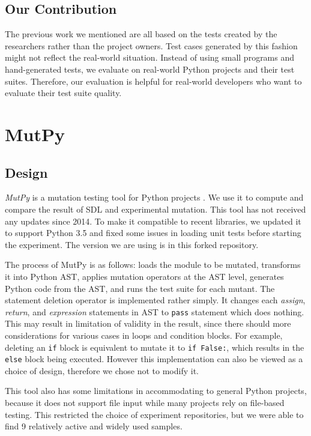 \documentclass[12pt]{article}
\begin{document}
\subsection{Our Contribution}

The previous work we mentioned are all based on the tests created by the researchers rather than the project owners. Test cases generated by this fashion might not reflect the real-world situation. Instead of using small programs and hand-generated tests, we evaluate on real-world Python projects and their test suites. Therefore, our evaluation is helpful for real-world developers who want to evaluate their test suite quality.

\section{MutPy}

\subsection{Design}
\emph{MutPy} is a mutation testing tool for Python projects \cite{mutpy}. We use it to compute and compare the result of SDL and experimental mutation. This tool has not received any updates since 2014. To make it compatible to recent libraries, we updated it to support Python 3.5 and fixed some issues in loading unit tests before starting the experiment. The version we are using is in this forked repository.

The process of MutPy is as follows: loads the module to be mutated, transforms it into Python AST, applies mutation operators at the AST level, generates Python code from the AST, and runs the test suite for each mutant. The statement deletion operator is implemented rather simply. It changes each \emph{assign}, \emph{return}, and \emph{expression} statements in AST to \texttt{pass} statement which does nothing. This may result in limitation of validity in the result, since there should more considerations for various cases in loops and condition blocks. For example, deleting an \texttt{if} block is equivalent to mutate it to \texttt{if False:}, which results in the \texttt{else} block being executed. However this implementation can also be viewed as a choice of design, therefore we chose not to modify it.

This tool also has some limitations in accommodating to general Python projects, because it does not support file input while many projects rely on file-based testing. This restricted the choice of experiment repositories, but we were able to find 9 relatively active and widely used samples.
\end{document}
